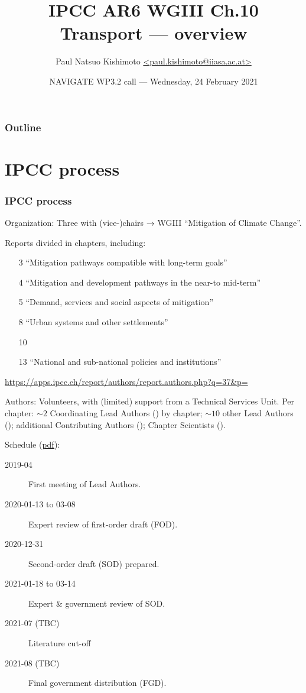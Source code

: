 \documentclass[12pt,aspectratio=169]{beamer}
\title{IPCC AR6 WGIII Ch.10 Transport — overview}
\institute{IIASA Energy, Climate, and Environment (ECE) Program}
\date{NAVIGATE WP3.2 call — Wednesday, 24 February 2021}
\author{\texorpdfstring{Paul Natsuo Kishimoto \scriptsize\newline
  \href{mailto:paul.kishimoto@iiasa.ac.at}%
       {\ttfamily <paul.kishimoto@iiasa.ac.at>}}%
  {Paul Natsuo Kishimoto <paul.kishimoto@iiasa.ac.at>}}
\begin{document}
\maketitle

\begin{frame}
\frametitle{Outline}

\tableofcontents

\end{frame}

\section{IPCC process}

\begin{frame}[allowframebreaks]
\frametitle{IPCC process}

Organization:
Three  with (vice-)chairs → WGIII “Mitigation of Climate Change”.

\smallskip
Reports divided in chapters, including:
\begin{enumerate}
  \item [3] “Mitigation pathways compatible with long-term goals”
  \item [4] “Mitigation and development pathways in the near-to mid-term”
  \item [5] “Demand, services and social aspects of mitigation”
  \item [8] “Urban systems and other settlements”
  \item [10] 
  \item [13] “National and sub-national policies and institutions”
\end{enumerate}

\url{https://apps.ipcc.ch/report/authors/report.authors.php?q=37&p=}

\framebreak

Authors:
Volunteers, with (limited) support from a Technical Services Unit.
Per chapter: $\sim 2$ Coordinating Lead Authors () by chapter; $\sim 10$ other Lead Authors (); additional Contributing Authors (); Chapter Scientists ().

\bigskip
Schedule (\href{https://www.ipcc.ch/site/assets/uploads/2021/02/WGIII-Schedule_external.pdf}{pdf}):
\begin{description}
  \item [2019-04] First meeting of Lead Authors.
  \item [2020-01-13 to 03-08] Expert review of first-order draft (FOD).
  \item [2020-12-31] Second-order draft (SOD) prepared.
  \item [2021-01-18 to 03-14] Expert \& government review of SOD.
  \item [2021-07 (TBC)] Literature cut-off
  \item [2021-08 (TBC)] Final government distribution (FGD).
\end{description}

\end{frame}
\end{document}
